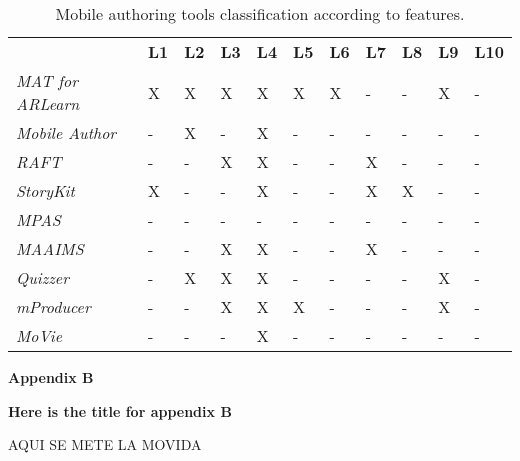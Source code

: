 \begin{small}

\begin{table}[h]
  \centering
  \small
  \caption{Mobile authoring tools classification according to features.}
  \label{tbl:appendix1}
\begin{tabular}{lllllllllll}
\thickhline
\textbf{ } & \textbf{L1} & \textbf{L2} & \textbf{L3} & \textbf{L4} & \textbf{L5} & \textbf{L6} & \textbf{L7} & \textbf{L8} & \textbf{L9} & \textbf{L10} \\ \thickhline
\textit{MAT for ARLearn} 	& X	& X	& X & X & X & X & - & - & X & -          \\ 
\textit{Mobile Author} 		& -	& X	& - & X & - & - & - & - & - & -          \\ 
\textit{RAFT} 				& -	& -	& X & X & - & - & X & - & - & -          \\ 
\textit{StoryKit} 			& X	& -	& - & X & - & - & X & X & - & -          \\ 
\textit{MPAS} 				& -	& -	& - & - & - & - & - & - & - & -          \\ 
\textit{MAAIMS} 			& -	& -	& X & X & - & - & X & - & - & -          \\ 
\textit{Quizzer} 			& -	& X	& X & X & - & - & - & - & X & -          \\ 
\textit{mProducer} 			& -	& -	& X & X & X & - & - & - & X & -          \\ 
\textit{MoVie} 				& -	& -	& - & X & - & - & - & - & - & -          \\ 
\end{tabular}
\end{table}

\end{small}



\clearpage{\pagestyle{empty}\cleardoublepage}

\begin{Large}
\textbf{Appendix B} 
\end{Large}
\vspace{3em}

\textbf{Here is the title for appendix B}

\begin{small}

AQUI SE METE LA MOVIDA

\end{small}



\clearpage{\pagestyle{empty}\cleardoublepage}
